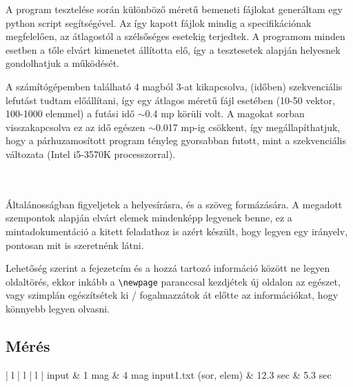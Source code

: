 \documentclass[12pt]{article}
\begin{document}
A program tesztelése során különböző méretű bemeneti fájlokat generáltam egy python script segítségével. Az így kapott fájlok mindig a specifikációnak megfelelően, az átlagostól a szélsőséges esetekig terjedtek.
A programom minden esetben a tőle elvárt kimenetet állította elő, így a tesztesetek alapján helyesnek gondolhatjuk a működését.

A számítógépemben található 4 magból 3-at kikapcsolva, (időben) szekvenciális lefutást tudtam előállítani, így egy átlagos méretű fájl esetében (10-50 vektor, 100-1000 elemmel) a futási idő $\sim$0.4 mp körüli volt. A magokat sorban visszakapcsolva ez az idő egészen $\sim$0.017 mp-ig csökkent, így megállapíthatjuk, hogy a párhuzamosított program tényleg gyorsabban futott, mint a szekvenciális változata (Intel i5-3570K processzorral).\\
\\
\\
\begin{itshape}
Általánosságban figyeljetek a helyesírásra, és a szöveg formázására. A megadott szempontok alapján elvárt elemek mindenképp legyenek benne, ez a mintadokumentáció a kitett feladathoz is azért készült, hogy legyen egy irányelv, pontosan mit is szeretnénk látni.

Lehetőség szerint a fejezetcím és a hozzá tartozó információ között ne legyen oldaltörés, ekkor inkább a \verb|\newpage| paranccsal kezdjétek új oldalon az egészet, vagy szimplán egészítsétek ki / fogalmazzátok át előtte az információkat, hogy könnyebb legyen olvasni.
\end{itshape}

\subsection{Mérés}
	\begin{center}
		\begin {tabular} {| l | l | l |}
			\hline
			input & 1 mag &  4 mag \hline \hline
			input1.txt (sor, elem) & 12.3 sec & 5.3 sec \hline
			\end{tabular}
		\end{center}
\end{document}
